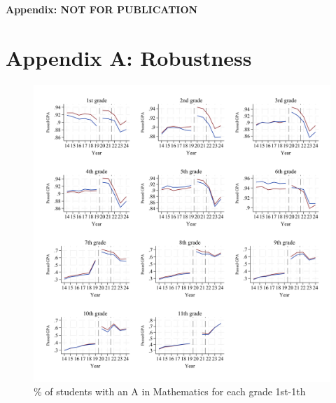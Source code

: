 \clearpage

\setcounter{figure}{0}
\renewcommand\thefigure{A.\arabic{figure}}    

\setcounter{table}{0}
\renewcommand{\thetable}{A.\arabic{table}}


\begin{center}
\huge
\textbf{Appendix: NOT FOR PUBLICATION}
\normalsize
\end{center}


\section*{Appendix A: Robustness} \label{sec:appa}
\newpage




\newpage














\begin{figure}[htbp]
         \centering
        \includegraphics[width=\textwidth]{./FIGURES/Descriptive/raw_grades_pass_math_siblings.pdf}
        \caption{\% of students with an A in Mathematics for each grade 1st-1th}
        \label{fig:trend_pass_grades}
\end{figure}

